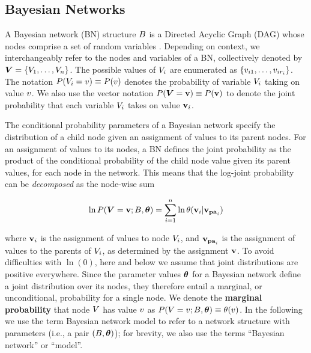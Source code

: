 {{\subsection{Bayesian Networks}

A Bayesian network (BN) structure $B$ is a Directed Acyclic Graph (DAG)  whose nodes comprise a set of random variables \citep{Pearl1988}. Depending on context, we interchangeably refer to the nodes  and variables of a BN, collectively denoted by $\boldsymbol{V} = \{V_{1},\ldots,V_{n}\}$. 
The possible values of $V_{i}$ are enumerated as $\{v_{i1},\ldots,v_{ir_{i}}\}$. The notation $P(V_{i} = v)\equiv P(v)$ denotes the probability of variable $V_{i}$ taking on value $v$. We also use the vector notation $P(\boldsymbol{V} = \mathbf{v}) \equiv P(\mathbf{v})$ to denote the joint probability that each variable $V_{i}$ takes on value $\mathbf{v}_{i}$. 


The conditional probability parameters of a Bayesian network specify the distribution of a child node given an assignment of values to its parent nodes. For an assignment of values to its nodes, a BN defines the joint probability as the product of the conditional probability of the child node value given its parent values, for each node in the network. This means that the log-joint probability can be {\em decomposed} as the node-wise sum

\begin{equation} \label{eq:bn}
\ln P(\boldsymbol{V} = \mathbf{v};B,\boldsymbol{\theta}) = \sum_{i=1}^{n} \ln \theta(\mathbf{v}_{i}|\mathbf{v}_{\mathbf{pa}_{i}})
\end{equation}

\noindent where $\mathbf{v}_{i}$ is the assignment of values to node $V_{i}$, and $\mathbf{v}_{\mathbf{pa}_{i}}$  is the assignment of values to the parents of $V_{i}$, as determined by the assignment $\mathbf{v}$. 
To avoid difficulties with $\ln(0)$, here and below we assume that joint distributions are positive everywhere. Since the parameter values $\boldsymbol{\theta}$ for a Bayesian network define a joint distribution over its nodes, they therefore entail a marginal, or unconditional, probability for a single node. We denote the \textbf{marginal probability} that node $V$ has value $v$ as $P(V = v;B,\boldsymbol{\theta}) \equiv \theta(v)$. In the following we use the term Bayesian network model to refer to a network structure with parameters (i.e., a pair $(B,\boldsymbol{\theta})$); for brevity, we also use the terms ``Bayesian network'' or ``model''. 

}}
